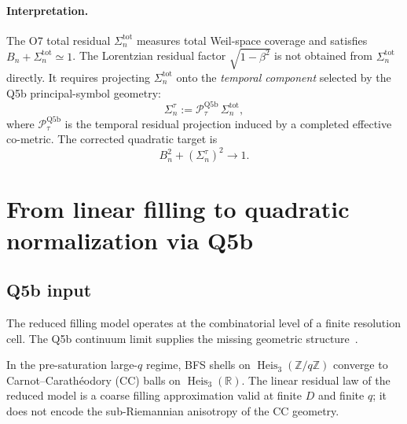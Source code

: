 \documentclass[11pt]{article}
\begin{document}
    \paragraph{Interpretation.}
      The O7 total residual $\Sigma_n^{\mathrm{tot}}$ measures total Weil-space
      coverage and satisfies $B_n + \Sigma_n^{\mathrm{tot}} \simeq 1$.
      The Lorentzian residual factor $\sqrt{1-\beta^2}$ is not obtained from
      $\Sigma_n^{\mathrm{tot}}$ directly.
      It requires projecting $\Sigma_n^{\mathrm{tot}}$ onto the \emph{temporal
  component} selected by the Q5b principal-symbol geometry:
      \[
        \Sigma_n^\tau := \mathcal{P}_\tau^{\mathrm{Q5b}}\,\Sigma_n^{\mathrm{tot}},
      \]
      where $\mathcal{P}_\tau^{\mathrm{Q5b}}$ is the temporal residual projection
      induced by a completed effective co-metric.
      The corrected quadratic target is
      \[
        B_n^2 + (\Sigma_n^\tau)^2 \longrightarrow 1.
      \]

  \section{From linear filling to quadratic normalization via Q5b}
  \label{sec:q5b}

  \subsection{Q5b input}

    The reduced filling model operates at the combinatorial level of a finite
    resolution cell.
    The Q5b continuum limit supplies the missing geometric structure~\cite{Beau2026q5b}.

    In the pre-saturation large-$q$ regime, BFS shells on
    $\operatorname{Heis}_3(\mathbb{Z}/q\mathbb{Z})$ converge to
    Carnot--Carath\'eodory (CC) balls on $\operatorname{Heis}_3(\mathbb{R})$.
    The linear residual law of the reduced model is a coarse filling approximation
    valid at finite $D$ and finite $q$; it does not encode the sub-Riemannian
    anisotropy of the CC geometry.
\end{document}
